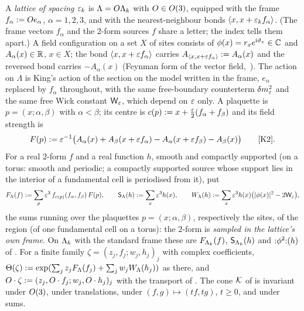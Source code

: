 \begin{definition}\label{rot:def:frames}
A \emph{lattice of spacing $\varepsilon_k$} is $\Lambda=O\Lambda_k$ with $O\in O(3)$, equipped with the frame $f_\alpha:= Oe_\alpha$, $\alpha=1,2,3$, and with the nearest-neighbour bonds $\langle x,x+\varepsilon_kf_\alpha\rangle$. (The frame vectors $f_\alpha$ and the $2$-form sources $f$ share a letter; the index tells them apart.) A field configuration on a set $X$ of sites consists of $\phi(x)=r_xe^{\mathrm i\vartheta_x}\in\mathbb C$ and $A_\alpha(x)\in\mathbb R$, $x\in X$; the bond $\langle x,x+\varepsilon f_\alpha\rangle$ carries $A_{\langle x,x+\varepsilon f_\alpha\rangle}:= A_\alpha(x)$ and the reversed bond carries $-A_\alpha(x)$ (Feynman form of the vector field,~\cite[(2.5)]{K2}). The action on $\Lambda$ is King's action of the section on the model written in the frame, $e_\alpha$ replaced by $f_\alpha$ throughout, with the same free-boundary counterterm $\delta m^2_{\varepsilon}$ and the same free Wick constant $\mathsf W_{\varepsilon}$, which depend on $\varepsilon$ only. A plaquette is $p=(x;\alpha,\beta)$ with $\alpha<\beta$; its centre is $c(p):= x+\frac{\varepsilon}2(f_\alpha+f_\beta)$ and its field strength is
\[
F(p)\defeq\eps^{-1}\big(A_\alpha(x)+A_\beta(x+\eps f_\alpha)-A_\alpha(x+\eps f_\beta)-A_\beta(x)\big)
\qquad\text{\cite[(2.11)]{K2}}.
\]
For a real $2$-form $f$ and a real function $h$, smooth and compactly supported (on a torus: smooth and periodic; a compactly supported source whose support lies in the interior of a fundamental cell is periodised from it), put
\[
F_\Lambda(f):=\sum_p\varepsilon^3\,f_{c(p)}(f_\alpha,f_\beta)\,F(p),\qquad
\mathsf S_\Lambda(h):=\sum_x\varepsilon^3h(x),\qquad
W_\Lambda(h):=\sum_x\varepsilon^3h(x)\big(|\phi(x)|^2-2\mathsf W_{\varepsilon}\big),
\]
the sums running over the plaquettes $p=(x;\alpha,\beta)$, respectively the sites, of the region (of one fundamental cell on a torus): the $2$-form is \emph{sampled in the lattice's own frame}. On $\Lambda_k$ with the standard frame these are $F_{\Lambda_k}(f)$, $\mathsf S_{\Lambda_k}(h)$ and ${:}\phi^2{:}(h)$ of . For a finite family $\zeta=(z_j,f_j;w_j,h_j)_j$ with complex coefficients, $\Theta(\zeta):=\exp(\sum_jz_jF_\Lambda(f_j)+\sum_jw_jW_\Lambda(h_j))$ as there, and $O\cdot\zeta:=(z_j,O\cdot f_j;w_j,O\cdot h_j)_j$ with the transport of . The cone $\mathcal K$ of  is invariant under $O(3)$, under translations, under $(f,g)\mapsto(tf,tg)$, $t\ge0$, and under sums.
\end{definition}

